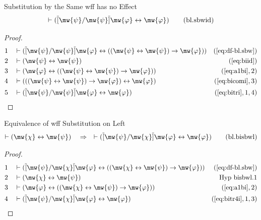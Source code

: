 \begin{lemma} Substitution by the Same wff has no Effect
\begin{align}
\vdash ( \overline{[} \mw{\psi} / \mw{\psi} \overline{]} \mw{\varphi}
    \leftrightarrow \mw{\varphi} )\label{eq:bl.sbwid}\tag{bl.sbwid}
\end{align}
\end{lemma}

\begin{proof}
\begin{align}
  1 &&  & \vdash ( \overline{[} \mw{\psi} / \mw{\psi} \overline{]} \mw{\varphi} \leftrightarrow ( ( \mw{\psi} \leftrightarrow \mw{\psi} ) \rightarrow \mw{\varphi} ) )&(\mbox{\ref{eq:df-bl.sbw}})\notag
  \\ 2 &&  & \vdash ( \mw{\psi} \leftrightarrow \mw{\psi} )&(\mbox{\ref{eq:biid}})\notag
  \\ 3 &&  & \vdash ( \mw{\varphi} \leftrightarrow ( ( \mw{\psi} \leftrightarrow \mw{\psi} ) \rightarrow \mw{\varphi} ) )&(\mbox{\ref{eq:a1bi}},2)\notag
  \\ 4 &&  & \vdash ( ( ( \mw{\psi} \leftrightarrow \mw{\psi} ) \rightarrow \mw{\varphi} ) \leftrightarrow \mw{\varphi} )&(\mbox{\ref{eq:bicomi}},3)\notag
  \\ 5 &&  & \vdash ( \overline{[} \mw{\psi} / \mw{\psi} \overline{]} \mw{\varphi} \leftrightarrow \mw{\varphi} )&(\mbox{\ref{eq:bitri}},1,4)\notag
\end{align}
\end{proof}

\begin{lemma} Equivalence of wff Substitution on Left
\begin{align}
\vdash ( \mw{\chi} \leftrightarrow \mw{\psi} )\quad\Rightarrow\quad \vdash (
    \overline{[} \mw{\psi} / \mw{\chi} \overline{]} \mw{\varphi}
    \leftrightarrow \mw{\varphi} )\label{eq:bl.bisbwl}\tag{bl.bisbwl}
\end{align}
\end{lemma}

\begin{proof}
\begin{align}
  1 &&  & \vdash ( \overline{[} \mw{\psi} / \mw{\chi} \overline{]} \mw{\varphi} \leftrightarrow ( ( \mw{\chi} \leftrightarrow \mw{\psi} ) \rightarrow \mw{\varphi} ) )&(\mbox{\ref{eq:df-bl.sbw}})\notag
  \\ 2 &&  & \vdash ( \mw{\chi} \leftrightarrow \mw{\psi} )&\text{Hyp~bisbwl.1}\notag%
  \\ 3 &&  & \vdash ( \mw{\varphi} \leftrightarrow ( ( \mw{\chi} \leftrightarrow \mw{\psi} ) \rightarrow \mw{\varphi} ) )&(\mbox{\ref{eq:a1bi}},2)\notag
  \\ 4 &&  & \vdash ( \overline{[} \mw{\psi} / \mw{\chi} \overline{]} \mw{\varphi} \leftrightarrow \mw{\varphi} )&(\mbox{\ref{eq:bitr4i}},1,3)\notag
\end{align}
\end{proof}

